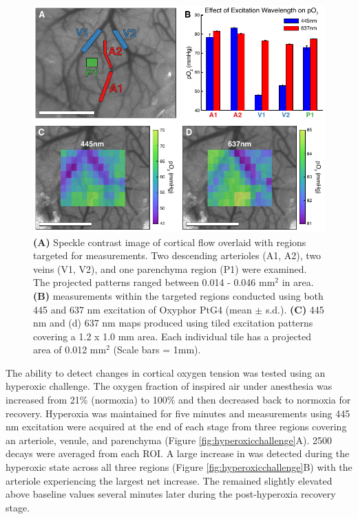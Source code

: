 \begin{figure}
    \includegraphics{figures/chapter_2/staticpO2.pdf}
    \caption {
        \label{fig:staticpO2}
        \textbf{(A)} Speckle contrast image of cortical flow overlaid with regions targeted for  measurements. Two descending arterioles (A1, A2), two veins (V1, V2), and one parenchyma region (P1) were examined. The projected patterns ranged between 0.014 - 0.046 mm$^2$ in area. \textbf{(B)}  measurements within the targeted regions conducted using both 445 and 637 nm excitation of Oxyphor PtG4 (mean $\pm$ s.d.). \textbf{(C)} 445 nm and (d) 637 nm  maps produced using tiled excitation patterns covering a 1.2 x 1.0 mm area. Each individual tile has a projected area of 0.012 mm$^2$ (Scale bars = 1mm).
    }
\end{figure}

The ability to detect changes in cortical oxygen tension was tested using an hyperoxic challenge. The oxygen fraction of inspired air under anesthesia was increased from 21\% (normoxia) to 100\% and then decreased back to normoxia for recovery. Hyperoxia was maintained for five minutes and  measurements using 445 nm excitation were acquired at the end of each stage from three regions covering an arteriole, venule, and parenchyma (Figure \ref{fig:hyperoxicchallenge}A). 2500 decays were averaged from each ROI. A large increase in  was detected during the hyperoxic state across all three regions (Figure \ref{fig:hyperoxicchallenge}B) with the arteriole experiencing the largest net increase. The  remained slightly elevated above baseline values several minutes later during the post-hyperoxia recovery stage.


